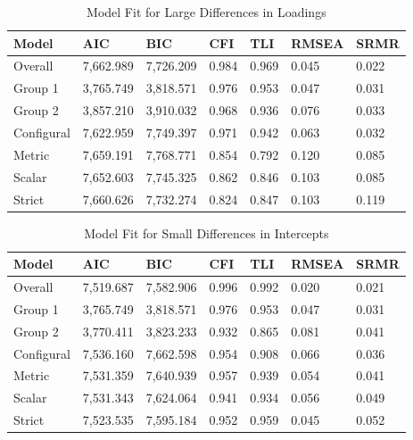 \documentclass[
  man]{apa7}
\begin{document}
\begin{table}[tbp]

\begin{center}
\begin{threeparttable}

\caption{\label{tab:tab4}Model Fit for Large Differences in Loadings}

\begin{tabular}{lllllll}
\toprule
Model & AIC & BIC & CFI & TLI & RMSEA & SRMR\\
\midrule
Overall & 7,662.989 & 7,726.209 & 0.984 & 0.969 & 0.045 & 0.022\\
Group 1 & 3,765.749 & 3,818.571 & 0.976 & 0.953 & 0.047 & 0.031\\
Group 2 & 3,857.210 & 3,910.032 & 0.968 & 0.936 & 0.076 & 0.033\\
Configural & 7,622.959 & 7,749.397 & 0.971 & 0.942 & 0.063 & 0.032\\
Metric & 7,659.191 & 7,768.771 & 0.854 & 0.792 & 0.120 & 0.085\\
Scalar & 7,652.603 & 7,745.325 & 0.862 & 0.846 & 0.103 & 0.085\\
Strict & 7,660.626 & 7,732.274 & 0.824 & 0.847 & 0.103 & 0.119\\
\bottomrule
\end{tabular}

\end{threeparttable}
\end{center}

\end{table}

\begin{table}[tbp]

\begin{center}
\begin{threeparttable}

\caption{\label{tab:tab5}Model Fit for Small Differences in Intercepts}

\begin{tabular}{lllllll}
\toprule
Model & AIC & BIC & CFI & TLI & RMSEA & SRMR\\
\midrule
Overall & 7,519.687 & 7,582.906 & 0.996 & 0.992 & 0.020 & 0.021\\
Group 1 & 3,765.749 & 3,818.571 & 0.976 & 0.953 & 0.047 & 0.031\\
Group 2 & 3,770.411 & 3,823.233 & 0.932 & 0.865 & 0.081 & 0.041\\
Configural & 7,536.160 & 7,662.598 & 0.954 & 0.908 & 0.066 & 0.036\\
Metric & 7,531.359 & 7,640.939 & 0.957 & 0.939 & 0.054 & 0.041\\
Scalar & 7,531.343 & 7,624.064 & 0.941 & 0.934 & 0.056 & 0.049\\
Strict & 7,523.535 & 7,595.184 & 0.952 & 0.959 & 0.045 & 0.052\\
\bottomrule
\end{tabular}

\end{threeparttable}
\end{center}

\end{table}
\end{document}
